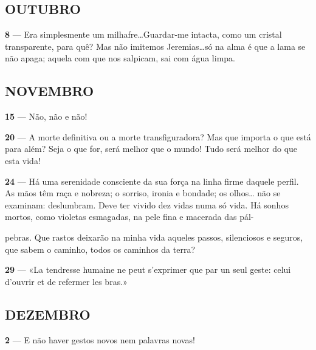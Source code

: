 \pagebreak



\subsection{OUTUBRO}

\textbf{8} — Era simplesmente um milhafre\ldots Guardar-me
intacta, como um cristal transparente, para quê? Mas
não imitemos Jeremias\ldots só na alma é que a lama se
não apaga; aquela com que nos salpicam, sai com água
limpa.

\subsection{NOVEMBRO}

\textbf{15} — Não, não e não!

\textbf{20} — A morte definitiva ou a morte transfiguradora?
Mas que importa o que está para além?
Seja o que for, será melhor que o mundo!
Tudo será melhor do que esta vida!

\textbf{24} — Há uma serenidade consciente da sua força na
linha firme daquele perfil. As mãos têm raça e
nobreza; o sorriso, ironia e bondade; os olhos\ldots
não se examinam: deslumbram. Deve ter vivido dez
vidas numa só vida. Há sonhos mortos, como 
violetas esmagadas, na pele fina e macerada das pál-

\pagebreak


pebras. Que rastos deixarão na minha vida aqueles
passos, silenciosos e seguros, que sabem o caminho,
todos os caminhos da terra?

\textbf{29} — «La tendresse humaine ne peut s’exprimer que
par un seul geste: celui d’ouvrir et de refermer les
bras.»

\subsection{DEZEMBRO}

\textbf{2} — E não haver gestos novos nem palavras novas!